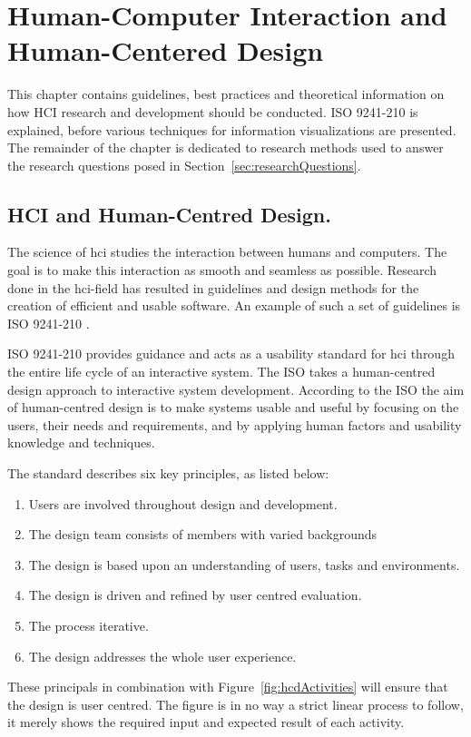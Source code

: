 \chapter{Human-Computer Interaction and Human-Centered Design}
\label{ch:hci}
This chapter contains guidelines, best practices and theoretical information on how HCI research and development should be conducted. ISO 9241-210 is explained, before various techniques for information visualizations are presented. The remainder of the chapter is dedicated to research methods used to answer the research questions posed in Section~\ref{sec:researchQuestions}.

\section{HCI and Human-Centred Design.}
The science of \gls{hci} studies the interaction between humans and computers. The goal is to make this interaction as smooth and seamless as possible. Research done in the \gls{hci}-field has resulted in guidelines and design methods for the creation of efficient and usable software. An example of such a set of guidelines is ISO 9241-210 \cite{iso9241}.

ISO 9241-210 provides guidance and acts as a usability standard for \gls{hci} through the entire life cycle of an interactive system. The ISO takes a human-centred design approach to interactive system development. According to the ISO the aim of human-centred design is to make systems usable and useful by focusing on the users, their needs and requirements, and by applying human factors and usability knowledge and techniques.  

The standard describes six key principles, as listed below: 
\begin{enumerate}[noitemsep]
  \item Users are involved throughout design and development.
  \item The design team consists of members with varied backgrounds
  \item The design is based upon an understanding of users, tasks and environments.
  \item The design is driven and refined by user centred evaluation.
  \item The process iterative.
  \item The design addresses the whole user experience.
\end{enumerate}

These principals in combination with Figure~\ref{fig:hcdActivities} will ensure that the design is user centred. The figure is in no way a strict linear process to follow, it merely shows the required input and expected result of each activity.

